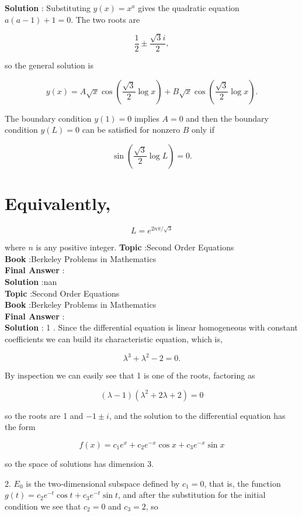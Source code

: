 \documentclass[10pt]{article}
\begin{document}
\textbf{Solution} : Substituting $y(x)=x^{a}$ gives the quadratic equation $a(a-1)+1=0$. The two roots are

$$
\frac{1}{2} \pm \frac{\sqrt{3} i}{2},
$$

so the general solution is

$$
y(x)=A \sqrt{x} \cos \left(\frac{\sqrt{3}}{2} \log x\right)+B \sqrt{x} \cos \left(\frac{\sqrt{3}}{2} \log x\right) .
$$

The boundary condition $y(1)=0$ implies $A=0$ and then the boundary condition $y(L)=0$ can be satisfied for nonzero $B$ only if

$$
\sin \left(\frac{\sqrt{3}}{2} \log L\right)=0 .
$$

\section{Equivalently,}

$$
L=e^{2 n \pi / \sqrt{3}}
$$

where $n$ is any positive integer.
\textbf{Topic} :Second Order Equations \\
\textbf{Book} :Berkeley Problems in Mathematics\\
\textbf{Final Answer} :\\


\textbf{Solution} :nan\\
\textbf{Topic} :Second Order Equations \\
\textbf{Book} :Berkeley Problems in Mathematics\\
\textbf{Final Answer} :\\


\textbf{Solution} : 1 . Since the differential equation is linear homogeneous with constant coefficients we can build its characteristic equation, which is,

$$
\lambda^{3}+\lambda^{2}-2=0 .
$$

By inspection we can easily see that 1 is one of the roots, factoring as

$$
(\lambda-1)\left(\lambda^{2}+2 \lambda+2\right)=0
$$

so the roots are 1 and $-1 \pm i$, and the solution to the differential equation has the form

$$
f(x)=c_{1} e^{x}+c_{2} e^{-x} \cos x+c_{3} e^{-x} \sin x
$$

so the space of solutions has dimension 3.

2. $E_{0}$ is the two-dimensional subspace defined by $c_{1}=0$, that is, the function $g(t)=c_{2} e^{-t} \cos t+c_{3} e^{-t} \sin t$, and after the substitution for the initial condition we see that $c_{2}=0$ and $c_{3}=2$, so
\end{document}
